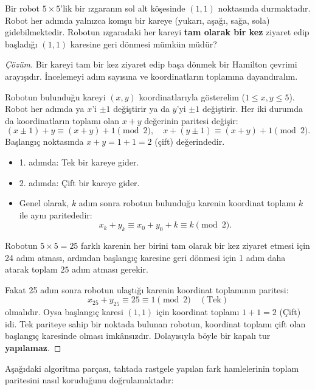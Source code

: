 \begin{example}
Bir robot $5 \times 5$'lik bir ızgaranın sol alt köşesinde $(1, 1)$ noktasında durmaktadır. Robot her adımda yalnızca komşu bir kareye (yukarı, aşağı, sağa, sola) gidebilmektedir. Robotun ızgaradaki her kareyi \textbf{tam olarak bir kez} ziyaret edip başladığı $(1, 1)$ karesine geri dönmesi mümkün müdür?
\end{example}

\begin{proof}[Çözüm]
Bir kareyi tam bir kez ziyaret edip başa dönmek bir Hamilton çevrimi arayışıdır. İncelemeyi adım sayısına ve koordinatların toplamına dayandıralım.

Robotun bulunduğu kareyi $(x, y)$ koordinatlarıyla gösterelim ($1 \le x, y \le 5$). Robot her adımda ya $x$'i $\pm 1$ değiştirir ya da $y$'yi $\pm 1$ değiştirir. Her iki durumda da koordinatların toplamı olan $x + y$ değerinin paritesi değişir:
\[
(x \pm 1) + y \equiv (x + y) + 1 \pmod 2, \quad x + (y \pm 1) \equiv (x + y) + 1 \pmod 2.
\]
Başlangıç noktasında $x + y = 1 + 1 = 2$ (çift) değerindedir.
\begin{itemize}
    \item 1. adımda: Tek bir kareye gider.
    \item 2. adımda: Çift bir kareye gider.
    \item Genel olarak, $k$ adım sonra robotun bulunduğu karenin koordinat toplamı $k$ ile aynı paritededir:
    \[
    x_k + y_k \equiv x_0 + y_0 + k \equiv k \pmod 2.
    \]
\end{itemize}
Robotun $5 \times 5 = 25$ farklı karenin her birini tam olarak bir kez ziyaret etmesi için 24 adım atması, ardından başlangıç karesine geri dönmesi için 1 adım daha atarak toplam $25$ adım atması gerekir.

Fakat 25 adım sonra robotun ulaştığı karenin koordinat toplamının paritesi:
\[
x_{25} + y_{25} \equiv 25 \equiv 1 \pmod 2 \quad (\text{Tek})
\]
olmalıdır. Oysa başlangıç karesi $(1, 1)$ için koordinat toplamı $1 + 1 = 2$ (Çift) idi. Tek pariteye sahip bir noktada bulunan robotun, koordinat toplamı çift olan başlangıç karesinde olması imkânsızdır. Dolayısıyla böyle bir kapalı tur \textbf{yapılamaz}.
\end{proof}

Aşağıdaki algoritma parçası, tahtada rastgele yapılan fark hamlelerinin toplam paritesini nasıl koruduğunu doğrulamaktadır:

